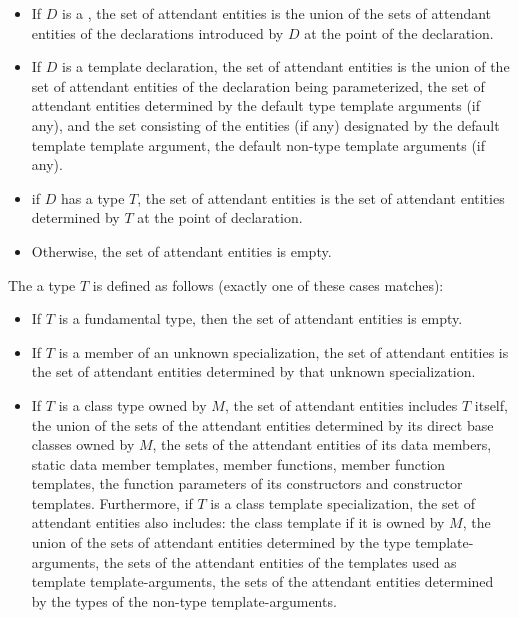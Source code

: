 \begin{std.txt}
\begin{before}
\begin{itemize}
    \item If $D$ is a , the set of attendant entities
    is the union of the sets of attendant entities of the declarations introduced by
    $D$ at the point of the declaration.

    \item If $D$ is a template declaration, the set of attendant entities is 
    the union of the set of attendant entities 
    of the declaration being parameterized, the set of attendant entities
    determined by the default type template arguments (if any), 
    and the set consisting of 
    the entities (if any) designated by the default template template argument,
    the default non-type template arguments (if any).

    \item if $D$ has a type $T$, the set of attendant entities is the set of 
    attendant entities determined by $T$ at the point of declaration.

    \item Otherwise, the set of attendant entities is empty.
  \end{itemize}
\end{before}\begin{before}\color{addclr}
  The  a type $T$ is defined as follows
  (exactly one of these cases matches):
  \begin{itemize}
    \item\color{addclr} If $T$ is a fundamental type, then
    the set of attendant entities is empty.

    \item\color{addclr} If $T$ is a member of an unknown specialization, the set of
    attendant entities is the set of attendant entities determined by that
    unknown specialization.

    \item\color{addclr} If $T$ is a class type owned by $M$, the set of attendant entities includes
    $T$ itself, the union of the sets of the attendant entities determined
    by its direct base classes owned by $M$, the sets of the
    attendant entities of its data members, static data member templates,
    member functions, member function templates, 
    the function parameters of its constructors and constructor templates.  
    Furthermore, if $T$ is a 
    class template specialization, the set of attendant entities also 
    includes: the class template if it is owned by $M$,
    the union of the sets of attendant entities determined by the type
    template-arguments, the sets of the attendant entities of the templates
    used as template template-arguments, the sets of the attendant entities
    determined by the types of the non-type template-arguments.


\end{itemize}
\end{before}
\end{std.txt}
